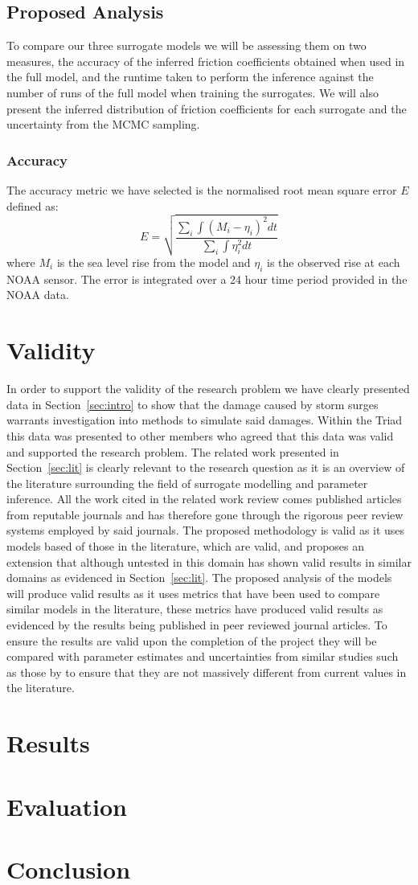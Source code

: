\documentclass[12pt,a4paper]{article}
\begin{document}
\subsection{Proposed Analysis}
\noindent
To compare our three surrogate models we will be assessing them on two measures, the accuracy of the inferred friction coefficients obtained when used in the full model, and the runtime taken to perform the inference against the number of runs of the full model when training the surrogates. We will also present the inferred distribution of friction coefficients for each surrogate and the uncertainty from the MCMC sampling.
\subsubsection{Accuracy}
\noindent
The accuracy metric we have selected is the normalised root mean square error $E$ defined as:
\begin{equation}
	E=\sqrt{\frac{\sum_{i}\int(M_i-\eta_i)^2dt}{\sum_{i}\int\eta^2_idt}}
\end{equation}
where $M_i$ is the sea level rise from the model and $\eta_i$ is the observed rise at each NOAA sensor. The error is integrated over a 24 hour time period provided in the NOAA data.
\section{Validity}\label{sec:val}
\noindent
In order to support the validity of the research problem we have clearly presented data in Section~\ref{sec:intro} to show that the damage caused by storm surges warrants investigation into methods to simulate said damages. Within the Triad this data was presented to other members who agreed that this data was valid and supported the research problem. The related work presented in Section~\ref{sec:lit} is clearly relevant to the research question as it is an overview of the literature surrounding the field of surrogate modelling and parameter inference. All the work cited in the related work review comes published articles from reputable journals and has therefore gone through the rigorous peer review systems employed by said journals. The proposed methodology is valid as it uses models based of those in the literature, which are valid, and proposes an extension that although untested in this domain has shown valid results in similar domains as evidenced in Section~\ref{sec:lit}. The proposed analysis of the models will produce valid results as it uses metrics that have been used to compare similar models in the literature, these metrics have produced valid results as evidenced by the results being published in peer reviewed journal articles. To ensure the results are valid upon the completion of the project they will be compared with parameter estimates and uncertainties from similar studies such as those by  to ensure that they are not massively different from current values in the literature.
\section{Results}
\noindent
\section{Evaluation}
\noindent
\section{Conclusion}
\noindent

\end{document}
